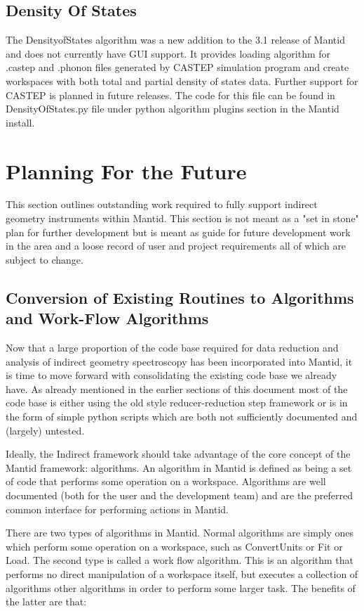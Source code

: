 \documentclass[paper=a4, fontsize=11pt]{scrartcl}	%
\numberwithin{equation}{section}															%
\numberwithin{figure}{section}																%
\numberwithin{table}{section}																%
\begin{document}
\subsection{Density Of States}
The DensityofStates algorithm was a new addition to the 3.1 release of Mantid and does not currently have GUI support. It provides loading algorithm for .castep and .phonon files generated by CASTEP simulation program and create workspaces with both total and partial density of states data. Further support for CASTEP is planned in future releases. The code for this file can be found in DensityOfStates.py file under python algorithm plugins section in the Mantid install.

\section{Planning For the Future}
This section outlines outstanding work required to fully support indirect geometry instruments within Mantid. This section is not meant as a "set in stone" plan for further development but is meant as guide for future development work in the area and a loose record of user and project requirements all of which are subject to change.

\subsection{Conversion of Existing Routines to Algorithms and Work-Flow Algorithms}
Now that a large proportion of the code base required for data reduction and analysis of indirect geometry spectroscopy has been incorporated into Mantid, it is time to move forward with consolidating the existing code base we already have. As already mentioned in the earlier sections of this document most of the code base is either using the old style reducer-reduction step framework or is in the form of simple python scripts which are both not sufficiently documented and (largely) untested.

Ideally, the Indirect framework should take advantage of the core concept of the Mantid framework: algorithms. An algorithm in Mantid is defined as being a set of code that performs some operation on a workspace. Algorithms are well documented (both for the user and the development team) and are the preferred common interface for performing actions in Mantid.

There are two types of algorithms in Mantid. Normal algorithms are simply ones which perform some operation on a workspace, such as ConvertUnits or Fit or Load. The second type is called a work flow algorithm. This is an algorithm that performs no direct manipulation of a workspace itself, but executes a collection of algorithms other algorithms in order to perform some larger task. The benefits of the latter are that: 
\end{document}
